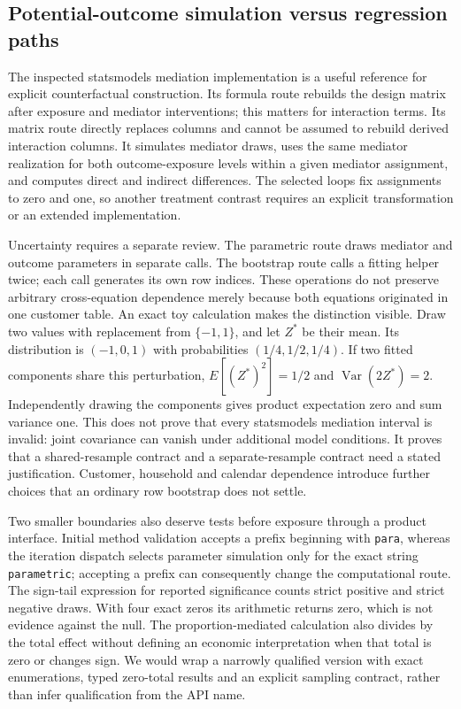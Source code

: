 \subsection{Potential-outcome simulation versus regression paths}
The inspected statsmodels mediation implementation is a useful reference for explicit counterfactual construction. Its formula route rebuilds the design matrix after exposure and mediator interventions; this matters for interaction terms. Its matrix route directly replaces columns and cannot be assumed to rebuild derived interaction columns. It simulates mediator draws, uses the same mediator realization for both outcome-exposure levels within a given mediator assignment, and computes direct and indirect differences. The selected loops fix assignments to zero and one, so another treatment contrast requires an explicit transformation or an extended implementation. \cite{exec25_pymed_statsmodels}

Uncertainty requires a separate review. The parametric route draws mediator and outcome parameters in separate calls. The bootstrap route calls a fitting helper twice; each call generates its own row indices. These operations do not preserve arbitrary cross-equation dependence merely because both equations originated in one customer table. An exact toy calculation makes the distinction visible. Draw two values with replacement from $\{-1,1\}$, and let $Z^*$ be their mean. Its distribution is $(-1,0,1)$ with probabilities $(1/4,1/2,1/4)$. If two fitted components share this perturbation, $E[(Z^*)^2]=1/2$ and $\operatorname{Var}(2Z^*)=2$. Independently drawing the components gives product expectation zero and sum variance one. This does not prove that every statsmodels mediation interval is invalid: joint covariance can vanish under additional model conditions. It proves that a shared-resample contract and a separate-resample contract need a stated justification. Customer, household and calendar dependence introduce further choices that an ordinary row bootstrap does not settle. \cite{exec25_pymed_statsmodels,exec25_pymed_choice}

Two smaller boundaries also deserve tests before exposure through a product interface. Initial method validation accepts a prefix beginning with \texttt{para}, whereas the iteration dispatch selects parameter simulation only for the exact string \texttt{parametric}; accepting a prefix can consequently change the computational route. The sign-tail expression for reported significance counts strict positive and strict negative draws. With four exact zeros its arithmetic returns zero, which is not evidence against the null. The proportion-mediated calculation also divides by the total effect without defining an economic interpretation when that total is zero or changes sign. We would wrap a narrowly qualified version with exact enumerations, typed zero-total results and an explicit sampling contract, rather than infer qualification from the API name. \cite{exec25_pymed_statsmodels,exec25_pymed_choice}

